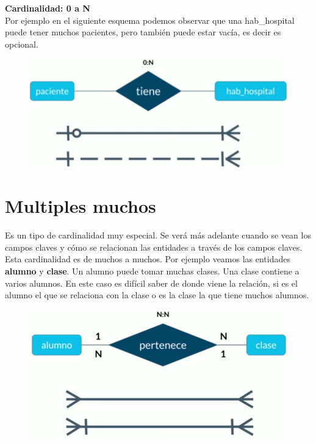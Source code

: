 \documentclass{article}
\begin{document}
\textbf{Cardinalidad: 0 a N}\\
Por ejemplo en el siguiente esquema podemos observar que una hab\_hospital
puede tener muchos pacientes, pero también puede estar vacía, es decir es
opcional.

\begin{figure}[h!]
    \centering
      \includegraphics[scale=0.45]{./Pictures/017_card_0_N.png}
\end{figure}


\section{Multiples muchos}%
Es un tipo de cardinalidad muy especial. Se verá más adelante cuando se vean
los campos claves y cómo se relacionan las entidades a través de los campos
claves.\\

Esta cardinalidad es de muchos a muchos. Por ejemplo veamos las entidades
\textbf{alumno} y \textbf{clase}. Un alumno puede tomar muchas clases. Una
clase contiene a varios alumnos. En este caso es difícil saber de donde viene
la relación, si es el alumno el que se relaciona con la clase o es la clase la
que tiene muchos alumnos.

\begin{figure}[h!]
    \centering
      \includegraphics[scale=0.45]{./Pictures/018_card_N_N.png}
\end{figure}
\end{document}
